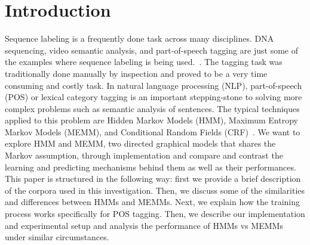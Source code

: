 \section{Introduction}
\label{sec:introduction}

Sequence labeling is a frequently done task across many disciplines. DNA sequencing, video semantic analysis, and part-of-speech tagging are just some of the examples where sequence labeling is being used.~\cite{dnaEx, videoEx, nlpEx}. The tagging task was traditionally done manually by inspection and proved to be a very time consuming and costly task. In natural language processing (NLP), part-of-speech (POS) or lexical category tagging is an important stepping-stone to solving more complex problems such as semantic analysis of sentences. The typical techniques applied to this problem are Hidden Markov Models (HMM), Maximum Entropy Markov Models (MEMM), and Conditional Random Fields (CRF)~\cite{nlpBook}. We want to explore HMM and MEMM, two directed graphical models that shares the Markov assumption, through implementation and compare and contrast the learning and predicting mechanisms behind them as well as their performances. This paper is structured in the following way: first we provide a brief description of the corpora used in this investigation. Then, we discuss some of the similarities and differences between HMMs and MEMMs. Next, we explain how the training process works specifically for POS tagging. Then, we describe our implementation and experimental setup and analysis the performance of HMMs vs MEMMs under similar circumstances.
